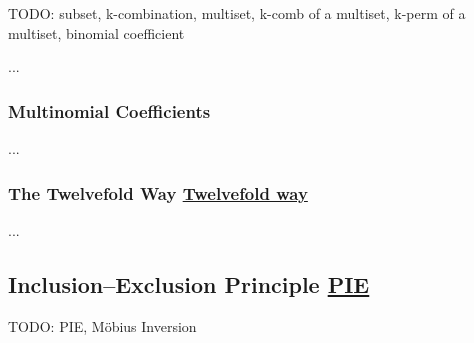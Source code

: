 \documentclass[a4paper,10pt]{article}
\begin{document}
\noindent TODO: subset, k-combination, multiset, k-comb of a multiset, k-perm of a multiset, binomial coefficient

\begin{terms}
    \item ...
\end{terms}

\subsubsection{Multinomial Coefficients}

\begin{terms}
    \item ...
\end{terms}

\subsubsection{The Twelvefold Way%
\texorpdfstring{\hfill\normalsize\href{https://en.wikipedia.org/wiki/Twelvefold_way}{Twelvefold way}}{}}

\begin{terms}
    \item ...
\end{terms}

\subsection{Inclusion--Exclusion Principle%
\texorpdfstring{\hfill\normalsize\href{https://en.wikipedia.org/wiki/Inclusion-exclusion_principle}{PIE}}{}}

\noindent TODO: PIE, M\"{o}bius Inversion

\end{document}
